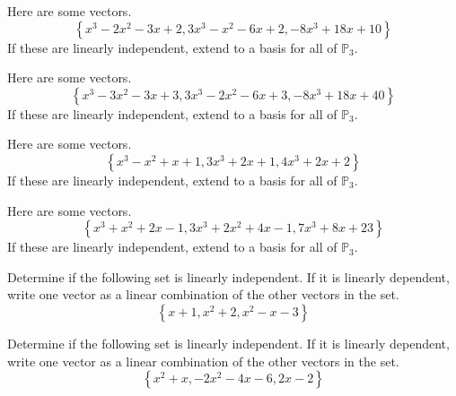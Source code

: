 \begin{enumialphparenastyle}
\begin{ex} Here are some vectors.
\begin{equation*}
\left\{ x^{3}-2x^{2}-3x+2,3x^{3}-x^{2}-6x+2,-8x^{3}+18x+10\right\}
\end{equation*}
If these are linearly independent, extend to a basis for all of $\mathbb{P}
_{3}$.
\end{ex}


\begin{ex} Here are some vectors.
\begin{equation*}
\left\{ x^{3}-3x^{2}-3x+3,3x^{3}-2x^{2}-6x+3,-8x^{3}+18x+40\right\}
\end{equation*}
If these are linearly independent, extend to a basis for all of $\mathbb{P}
_{3}$.
\end{ex}


\begin{ex} Here are some vectors.
\begin{equation*}
\left\{ x^{3}-x^{2}+x+1,3x^{3}+2x+1,4x^{3}+2x+2\right\}
\end{equation*}
If these are linearly independent, extend to a basis for all of $\mathbb{P}
_{3}$.
\end{ex}


\begin{ex} Here are some vectors.
\begin{equation*}
\left\{ x^{3}+x^{2}+2x-1,3x^{3}+2x^{2}+4x-1,7x^{3}+8x+23\right\}
\end{equation*}
If these are linearly independent, extend to a basis for all of $\mathbb{P}
_{3}$.
\end{ex}


\begin{ex} Determine if the following set is linearly independent. If it is linearly dependent, write one vector as a linear combination of the other vectors in the set. 
\[
\left\{ x+1, x^2 + 2, x^2 - x -3 \right\}
\]
\end{ex}

\begin{ex} Determine if the following set is linearly independent. If it is linearly dependent, write one vector as a linear combination of the other vectors in the set. 
\[
\left\{ x^2 + x, -2x^2 -4x -6 , 2x - 2 \right\}
\]
\end{ex}


\end{enumialphparenastyle}
